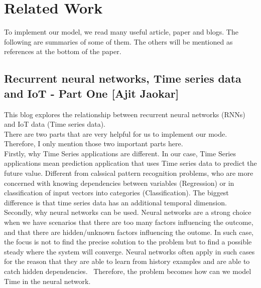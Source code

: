 \documentclass[prodmode,acmtecs]{acmsmall} %
\begin{document}
\newpage
\section{Related Work}
To implement our model, we read many useful article, paper and blogs. The following are 
summaries of some of them. The others will be mentioned as references at the bottom of the paper.

\subsection{Recurrent neural networks, Time series data and IoT - Part One [Ajit Jaokar]}
This blog explores the relationship between recurrent neural networks (RNNs) and IoT data (Time series data). \\
There are two parts that are very helpful for us to implement our mode. Therefore, I only mention those two important parts here. \\ Firstly, why Time Series applications are different. In our case, Time Series applications mean prediction application that uses Time series data to predict the future value. Different from calssical pattern recognition problems, who are more concerned with knowing dependencies between variables (Regression) or in classification of input vectors into categories (Classification). The biggest difference is that time series data has an additional temporal dimension. \\ Secondly, why neural networks can be used. Neural networks are a strong choice when we have scenarios that there are too many factors influencing the outcome, and that there are hidden/unknown factors influencing the outome. In such case, the focus is not to find the precise solution to the problem but to find a possible steady where the system will converge. Neural networks often apply in such cases for the reason that they are able to learn from history examples and are able to catch hidden dependencies. \ Therefore, the problem becomes how can we model Time in the neural network.
\end{document}
